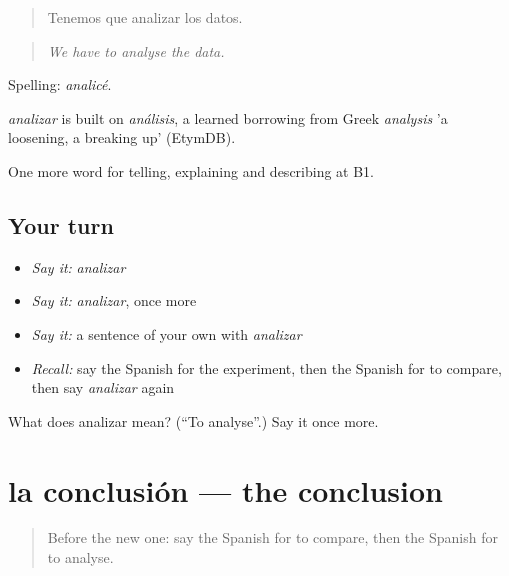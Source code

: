 \begin{quote}
Tenemos que analizar los datos.
\end{quote}

\begin{quote}
\emph{We have to analyse the data.}
\end{quote}

Spelling: \emph{analicé}.

\begin{cousinweb}
\emph{analizar} is built on \emph{análisis}, a learned borrowing from Greek \emph{analysis} 'a loosening, a breaking up' (EtymDB).
\end{cousinweb}

\begin{grammarlens}[title={What you've built}]
One more word for telling, explaining and describing at B1.
\end{grammarlens}

\subsection*{Your turn}
\begin{itemize}
\raggedright
  \item \emph{Say it:} \emph{analizar}
  \item \emph{Say it:} \emph{analizar}, once more
  \item \emph{Say it:} a sentence of your own with \emph{analizar}
  \item \emph{Recall:} say the Spanish for the experiment, then the Spanish for to compare, then say \emph{analizar} again
\end{itemize}

\begin{tcolorbox}[breakable,colback=teal!4,colframe=teal!35!black,title={Before you move on}]
What does analizar mean? (\textquotedblleft{}To analyse\textquotedblright{}.) Say it once more.
\end{tcolorbox}
\section[la conclusión]{la conclusión — the conclusion}

\label{lesson:ES-C599-conclusion}



\begin{quote}
Before the new one: say the Spanish for to compare, then the Spanish for to analyse.
\end{quote}

